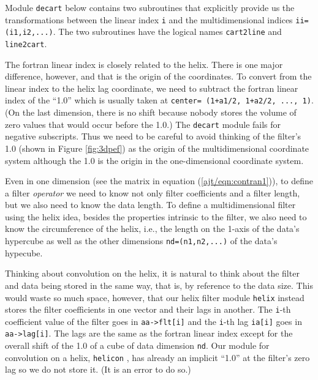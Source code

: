 \par
Module \texttt{decart} below contains
two subroutines that
explicitly provide us the transformations
between the linear index
\texttt{i}
and the multidimensional indices
\texttt{ii= (i1,i2,...)}.
The two subroutines have the logical names
\texttt{cart2line} and
\texttt{line2cart}.

\par
The fortran linear index is closely related to the helix.
There is one major difference, however,
and that is the origin of the coordinates.
To convert from the linear index
to the helix lag coordinate,
we need to subtract the fortran linear index of the ``1.0''
which is usually taken at
\texttt{center= (1+a1/2, 1+a2/2, ..., 1)}.
(On the last dimension, there is no shift because nobody stores the
volume of zero values that would occur before the 1.0.)
The \texttt{decart} module fails for negative subscripts.
Thus we need to be careful to avoid thinking of the filter's 1.0 
(shown in Figure \ref{fig:3dpef})
as the origin of the multidimensional coordinate system
although the 1.0 is the origin in the one-dimensional coordinate system.

\par
Even in one dimension
(see the matrix in equation (\ref{ajt/eqn:contran1})),
to define a filter {\it operator} we need to know
not only filter coefficients and a filter length,
but we also need to know the data length.
To define a multidimensional filter using the helix idea,
besides the properties intrinsic to the filter,
we also need to know the circumference of the helix,
i.e., the length on the 1-axis of the data's hypercube
as well as the other dimensions
\texttt{nd=(n1,n2,...)}
of the data's hypecube.

\par
Thinking about convolution on the helix,
it is natural to think about the filter and data being stored
in the same way, that is, by reference to the data size.
This would waste so much space, however,
that our helix filter module
\texttt{helix} 
instead stores the filter coefficients in one vector
and their lags in another.
The \texttt{i}-th coefficient value
of the filter goes in  \verb#aa->flt[i]# and
the \texttt{i}-th lag \texttt{ia[i]} goes in \verb#aa->lag[i]#.
The lags are the same as the fortran linear index
except for the overall shift of the 1.0 of a cube of 
data dimension \texttt{nd}.
Our module for convolution on a helix,
\texttt{helicon} ,
has already an implicit
``1.0'' at the filter's zero lag so we do not store it.
(It is an error to do so.)

